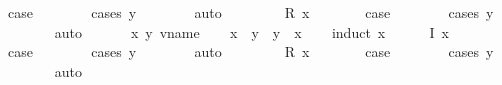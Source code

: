 \begin{isabellebody}
\ {\isacharquery}case\isanewline
\ \ \ \ \ \ \isamarkupfalse%
\ {\isacharparenleft}cases\ y{\isacharparenright}\isanewline
\ \ \ \ \ \ \isamarkupfalse%
\ auto\isanewline
\ \ \isamarkupfalse%
\isanewline
\ \ \ \ \isamarkupfalse%
\ {\isacharparenleft}R\ x{\isacharparenright}\isanewline
\ \ \ \ \isamarkupfalse%
\ \isamarkupfalse%
\ {\isacharquery}case\isanewline
\ \ \ \ \ \ \isamarkupfalse%
\ {\isacharparenleft}cases\ y{\isacharparenright}\isanewline
\ \ \ \ \ \ \isamarkupfalse%
\ auto\isanewline
\ \ \isamarkupfalse%
\isanewline
{}\isamarkupfalse%
\isanewline
\ \ \isamarkupfalse%
\ x\ y{\isacharcolon}{\isacharcolon}\ vname\isanewline
\ \ \isamarkupfalse%
\ {\isachardoublequoteopen}x\ {\isasymle}\ y\ {\isasymor}\ y\ {\isasymle}\ x{\isachardoublequoteclose}\isanewline
\ \ \isamarkupfalse%
\ {\isacharparenleft}induct\ x{\isacharparenright}\isanewline
\ \ \ \ \isamarkupfalse%
\ {\isacharparenleft}I\ x{\isacharparenright}\isanewline
\ \ \ \ \isamarkupfalse%
\ \isamarkupfalse%
\ {\isacharquery}case\isanewline
\ \ \ \ \ \ \isamarkupfalse%
\ {\isacharparenleft}cases\ y{\isacharparenright}\isanewline
\ \ \ \ \ \ \isamarkupfalse%
\ auto\isanewline
\ \ \isamarkupfalse%
\isanewline
\ \ \ \ \isamarkupfalse%
\ {\isacharparenleft}R\ x{\isacharparenright}\isanewline
\ \ \ \ \isamarkupfalse%
\ \isamarkupfalse%
\ {\isacharquery}case\isanewline
\ \ \ \ \ \ \isamarkupfalse%
\ {\isacharparenleft}cases\ y{\isacharparenright}\isanewline
\ \ \ \ \ \ \isamarkupfalse%
\ auto\isanewline
\ \ \isamarkupfalse%
\isanewline
{}\isamarkupfalse%
%
\endisatagproof
{\isafoldproof}%
%
\isadelimproof
%
\endisadelimproof
\isanewline
{}\isamarkupfalse%
\isanewline
%
\isadelimtheory
\isanewline
%
\endisadelimtheory
%
\isatagtheory
{}\isamarkupfalse%
%
\endisatagtheory
{\isafoldtheory}%
%
\isadelimtheory
%
\endisadelimtheory
%
\end{isabellebody}%
\endinput
